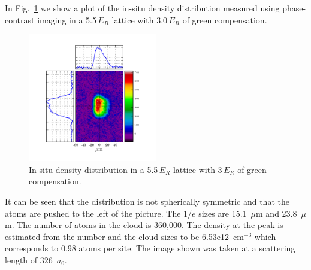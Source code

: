 \documentclass[11pt,letter]{article}
\begin{document}
 
In Fig.~\ref{fig:in-situ-density} we show a plot of the in-situ density
distribution measured using phase-contrast imaging in a 5.5\,$E_{R}$ lattice
with 3.0\,$E_{R}$ of green compensation.
\begin{figure}
\centering 
\includegraphics[width=0.5\textwidth]{figures_140129/densityInspec_7776.png}
\caption[In-situ density distribution]{\small 
In-situ density distribution in a 5.5\,$E_{R}$ lattice with 3\,$E_{R}$ of green
compensation.  } \label{fig:in-situ-density}
\end{figure}
It can be seen that the distribution is not spherically symmetric and that the
atoms are pushed to the left of the picture.  The $1/e$ sizes are 15.1~$\mu$m
and 23.8~$\mu$m.  The number of atoms in the cloud is 360,000.  The density at
the peak is estimated from the number and the cloud sizes to be
6.53e12~$\mathrm{cm}^{-3}$ which corresponds to 0.98 atoms per site.   The
image shown was taken at a scattering length of 326~$a_{0}$.
\end{document}
